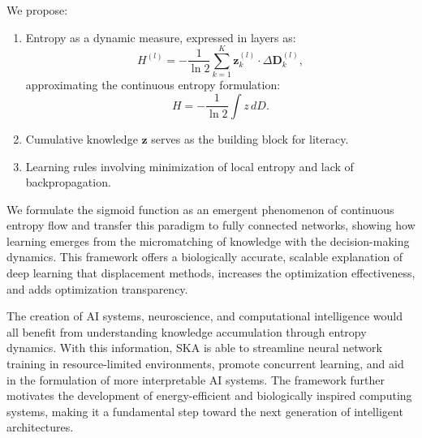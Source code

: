 \documentclass{article}
\begin{document}
We propose:
\begin{enumerate}
    \item Entropy as a dynamic measure, expressed in layers as:
    \begin{equation}\label{eq3}
    H^{(l)} = -\frac{1}{\ln 2} \sum_{k=1}^{K} \mathbf{z}^{(l)}_k \cdot \Delta \mathbf{D}^{(l)}_k,
    \end{equation}
    approximating the continuous entropy formulation:
    \begin{equation}\label{eq4}
    H = -\frac{1}{\ln 2} \int z \, dD.
    \end{equation}
    
    \item Cumulative knowledge \(\mathbf{z}\) serves as the building block for literacy.

\item Learning rules involving minimization of local entropy and lack of backpropagation.
\end{enumerate}

We formulate the sigmoid function as an emergent phenomenon of continuous entropy flow and transfer this paradigm to fully connected networks, showing how learning emerges from the micromatching of knowledge with the decision-making dynamics. This framework offers a biologically accurate, scalable explanation of deep learning that displacement methods, increases the optimization effectiveness, and adds optimization transparency. 

The creation of AI systems, neuroscience, and computational intelligence would all benefit from understanding knowledge accumulation through entropy dynamics. With this information, SKA is able to streamline neural network training in resource-limited environments, promote concurrent learning, and aid in the formulation of more interpretable AI systems. The framework further motivates the development of energy-efficient and biologically inspired computing systems, making it a fundamental step toward the next generation of intelligent architectures.
\end{document}

